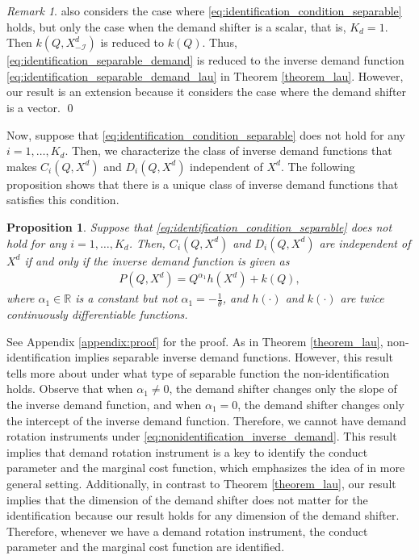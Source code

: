 \documentclass[11pt, a4paper]{article}
\newtheorem{proposition}{Proposition}
\theoremstyle{remark}
\newtheorem{remark}{Remark}
\begin{document}
\begin{remark}
    \citet{lau1982identifying} also considers the case where \eqref{eq:identification_condition_separable} holds, but only the case when the demand shifter is a scalar, that is, $K_d = 1$.
    Then $k(Q, X^{d}_{-\mathcal{I}})$ is reduced to $k(Q)$.
    Thus, \eqref{eq:identification_separable_demand} is reduced to the inverse demand function \eqref{eq:identification_separable_demand_lau} in Theorem \ref{theorem_lau}.
    However, our result is an extension because it considers the case where the demand shifter is a vector. \qed
\end{remark}

Now, suppose that \eqref{eq:identification_condition_separable} does not hold for any $i = 1, \ldots, K_d$.
Then, we characterize the class of inverse demand functions that makes $C_i(Q, X^{d})$ and $D_i(Q, X^{d})$ independent of $X^{d}$.
The following proposition shows that there is a unique class of inverse demand functions that satisfies this condition.
\begin{proposition}\label{proposition:nonidentification_inverse_demand}
    Suppose that \eqref{eq:identification_condition_separable} does not hold for any $i = 1, \ldots, K_d$.
    Then, $C_i(Q, X^{d})$ and $D_i(Q, X^{d})$ are independent of $X^{d}$ if and only if the inverse demand function is given as \begin{align}
        P(Q, X^{d}) = Q^{\alpha_1}h(X^{d}) + k(Q), \label{eq:nonidentification_inverse_demand}
    \end{align}
    where $\alpha_1 \in \mathbb{R}$ is a constant but not $\alpha_1 = -\frac{1}{\theta}$, and $h(\cdot)$ and $k(\cdot)$ are twice continuously differentiable functions.
\end{proposition}
See Appendix \ref{appendix:proof} for the proof.
As in Theorem \ref{theorem_lau}, non-identification implies separable inverse demand functions.
However, this result tells more about under what type of separable function the non-identification holds.
Observe that when $\alpha_1 \ne 0$, the demand shifter changes only the slope of the inverse demand function, and when $\alpha_1 = 0$, the demand shifter changes only the intercept of the inverse demand function.
Therefore, we cannot have demand rotation instruments under \eqref{eq:nonidentification_inverse_demand}.
This result implies that demand rotation instrument is a key to identify the conduct parameter and the marginal cost function, which emphasizes the idea of \citet{bresnahan1982oligopoly} in more general setting.
Additionally, in contrast to Theorem \ref{theorem_lau}, our result implies that the dimension of the demand shifter does not matter for the identification because our result holds for any dimension of the demand shifter.
Therefore, whenever we have a demand rotation instrument, the conduct parameter and the marginal cost function are identified.
\end{document}
